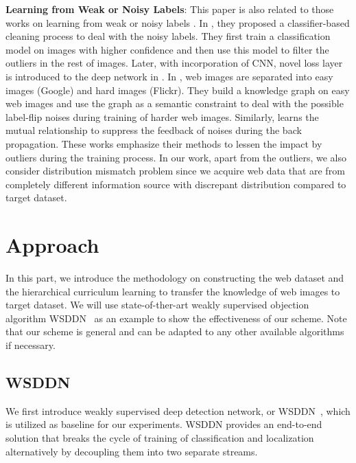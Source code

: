 \documentclass[10pt,twocolumn,letterpaper]{article}
\begin{document}
\textbf{Learning from Weak or Noisy Labels}: This paper is also related to those works on learning from weak or noisy labels \cite{divvala2014learning,reed2014training,chen2015webly,fu2015relaxing}. In \cite{divvala2014learning}, they proposed a  classifier-based cleaning process to deal with the noisy labels. They first train a classification model on images with higher confidence and then use this model to filter the outliers in the rest of images. Later, with incorporation of CNN, novel loss layer is introduced to the deep network in \cite{reed2014training}. In \cite{chen2015webly}, web images are separated into easy images (Google) and hard images (Flickr). They build a knowledge graph on easy web images and use the graph as a semantic constraint to deal with the possible label-flip noises during training of harder web images. Similarly, \cite{fu2015relaxing} learns the mutual relationship to suppress the feedback of noises during the back propagation. These works emphasize their methods to lessen the impact by outliers during the training process. In our work, apart from the outliers, we also consider distribution mismatch problem since we acquire web data that are from completely different information source with discrepant distribution compared to target dataset.




\section{Approach}
\label{approach}
In this part, we introduce the methodology on constructing the web dataset and the hierarchical curriculum learning to transfer the knowledge of web images to target dataset. We will use state-of-ther-art weakly supervised objection algorithm WSDDN~\cite{bilen2016weakly} as an example to show the effectiveness of our scheme. Note that our scheme is general and can be adapted to any other available algorithms if necessary.

\subsection {WSDDN}
 \label{sec:wsddn}
We first introduce weakly supervised deep detection network, or WSDDN~\cite{bilen2016weakly}, which is utilized as baseline for our experiments. WSDDN provides an end-to-end solution that breaks the cycle of training of classification and localization alternatively by decoupling them into two separate streams. 
\end{document}
